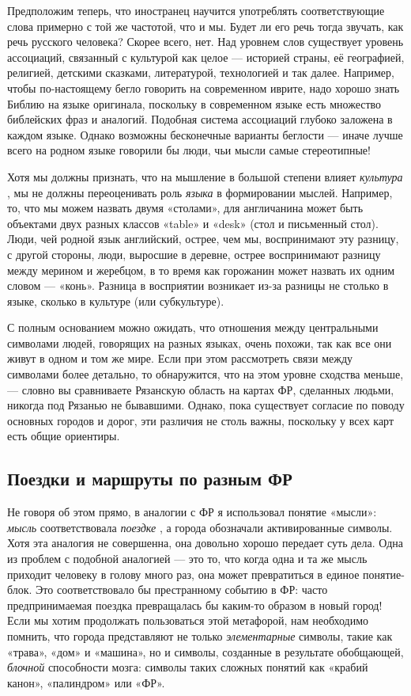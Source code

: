 \documentclass[../main.tex]{subfiles}
\begin{document}
Предположим теперь, что иностранец научится употреблять соответствующие слова примерно с той же частотой, что и мы. Будет ли его речь тогда звучать, как речь русского человека? Скорее всего, нет. Над уровнем слов существует уровень ассоциаций, связанный с культурой как целое --- историей страны, её географией, религией, детскими сказками, литературой, технологией и так далее. Например, чтобы по-настоящему бегло говорить на современном иврите, надо хорошо знать Библию на языке оригинала, поскольку в современном языке есть множество библейских фраз и аналогий. Подобная система ассоциаций глубоко заложена в каждом языке. Однако возможны бесконечные варианты беглости --- иначе лучше всего на родном языке говорили бы люди, чьи мысли самые стереотипные!

Хотя мы должны признать, что на мышление в большой степени влияет \emph{культура} , мы не должны переоценивать роль \emph{языка} в формировании мыслей. Например, то, что мы можем назвать двумя «столами», для англичанина может быть объектами двух разных классов «table» и «desk» (стол и письменный стол). Люди, чей родной язык английский, острее, чем мы, воспринимают эту разницу, с другой стороны, люди, выросшие в деревне, острее воспринимают разницу между мерином и жеребцом, в то время как горожанин может назвать их одним словом --- «конь». Разница в восприятии возникает из-за разницы не столько в языке, сколько в культуре (или субкультуре).

С полным основанием можно ожидать, что отношения между центральными символами людей, говорящих на разных языках, очень похожи, так как все они живут в одном и том же мире. Если при этом рассмотреть связи между символами более детально, то обнаружится, что на этом уровне сходства меньше, --- словно вы сравниваете Рязанскую область на картах ФР, сделанных людьми, никогда под Рязанью не бывавшими. Однако, пока существует согласие по поводу основных городов и дорог, эти различия не столь важны, поскольку у всех карт есть общие ориентиры.


\subsection{Поездки и маршруты по разным ФР}

Не говоря об этом прямо, в аналогии с ФР я использовал понятие «мысли»: \emph{мысль} соответствовала \emph{поездке} , а города обозначали активированные символы. Хотя эта аналогия не совершенна, она довольно хорошо передает суть дела. Одна из проблем с подобной аналогией --- это то, что когда одна и та же мысль приходит человеку в голову много раз, она может превратиться в единое понятие-блок. Это соответствовало бы престранному событию в ФР: часто предпринимаемая поездка превращалась бы каким-то образом в новый город! Если мы хотим продолжать пользоваться этой метафорой, нам необходимо помнить, что города представляют не только \emph{элементарные} символы, такие как «трава», «дом» и «машина», но и символы, созданные в результате обобщающей, \emph{блочной} способности мозга: символы таких сложных понятий как «крабий канон», «палиндром» или «ФР».
\end{document}
